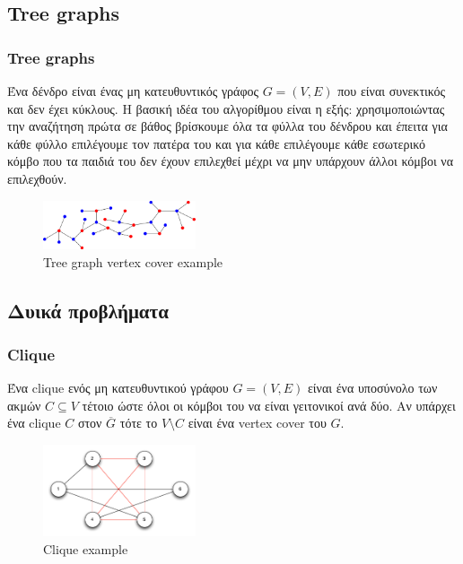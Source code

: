 \documentclass[greek]{beamer}
\begin{document}

\subsection{Tree graphs}


\begin{frame}
\frametitle{Tree graphs}
Ένα δένδρο είναι ένας μη κατευθυντικός γράφος $G=(V,E)$ που είναι συνεκτικός και δεν έχει κύκλους.
Η βασική ιδέα του αλγορίθμου είναι η εξής: χρησιμοποιώντας την αναζήτηση πρώτα σε βάθος βρίσκουμε όλα τα φύλλα του δένδρου και έπειτα για κάθε φύλλο επιλέγουμε τον πατέρα του και για κάθε επιλέγουμε κάθε εσωτερικό κόμβο που τα παιδιά του δεν έχουν επιλεχθεί μέχρι να μην υπάρχουν άλλοι κόμβοι να επιλεχθούν.
\begin{figure}[H]
\caption{Tree graph vertex cover example}
\centering
\includegraphics[width=0.4\textwidth]{Figures/vc_tree.png}\centering
\end{figure}
\end{frame}


\subsection{Δυικά προβλήματα}

\begin{frame}
\frametitle{Clique}
Ένα clique ενός μη κατευθυντικού γράφου $G=(V,E)$ είναι ένα υποσύνολο των ακμών $C \subseteq V$ τέτοιο ώστε όλοι οι κόμβοι του να είναι γειτονικοί ανά δύο.
Αν υπάρχει ένα clique $C$ στον $\overline{G}$ τότε το $V \setminus C$ είναι ένα vertex cover του $G$.\\

\begin{figure}[H]
\caption{Clique example}
\centering
\includegraphics[width=0.4\textwidth]{Figures/VertexClique.png}\centering
\end{figure}
\end{frame}
\end{document}
